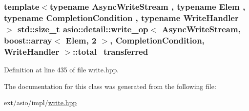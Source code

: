 \subsubsection[{total\+\_\+transferred\+\_\+}]{\setlength{\rightskip}{0pt plus 5cm}template$<$typename Async\+Write\+Stream , typename Elem , typename Completion\+Condition , typename Write\+Handler $>$ std\+::size\+\_\+t {\bf asio\+::detail\+::write\+\_\+op}$<$ Async\+Write\+Stream, {\bf boost\+::array}$<$ Elem, 2 $>$,                           Completion\+Condition, Write\+Handler $>$\+::total\+\_\+transferred\+\_\+}\label{classasio_1_1detail_1_1write__op_3_01_async_write_stream_00_01boost_1_1array_3_01_elem_00_012_018cbe26fbc46920cd28943bf9ace97230_a95b60aa6c5666d4dd6d601e44a3534b7}


Definition at line 435 of file write.\+hpp.



The documentation for this class was generated from the following file\+:\begin{DoxyCompactItemize}
\item 
ext/asio/impl/\hyperlink{impl_2write_8hpp}{write.\+hpp}\end{DoxyCompactItemize}

